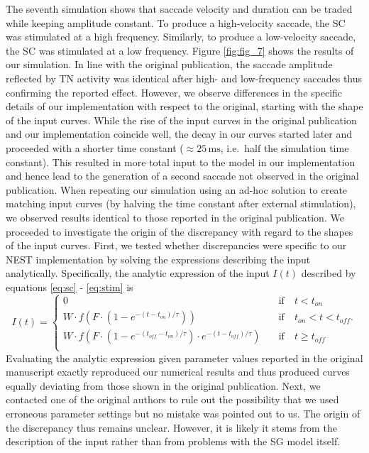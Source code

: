 \documentclass[10pt,a4paper,onecolumn]{article}
\begin{document}
The seventh simulation shows that saccade velocity and duration can be
traded while keeping amplitude constant. To produce a high-velocity
saccade, the SC was stimulated at a high frequency. Similarly, to
produce a low-velocity saccade, the SC was stimulated at a low
frequency. Figure \ref{fig:fig_7} shows the results of our simulation.
In line with the original publication, the saccade amplitude reflected
by TN activity was identical after high- and low-frequency saccades thus
confirming the reported effect. However, we observe differences in the
specific details of our implementation with respect to the original,
starting with the shape of the input curves. While the rise of the input
curves in the original publication and our implementation coincide well,
the decay in our curves started later and proceeded with a shorter time
constant (\(\approx25\,\mathrm{ms}\), i.e.~half the simulation time
constant). This resulted in more total input to the model in our
implementation and hence lead to the generation of a second saccade not
observed in the original publication. When repeating our simulation
using an ad-hoc solution to create matching input curves (by halving the
time constant after external stimulation), we observed results identical
to those reported in the original publication. We proceeded to
investigate the origin of the discrepancy with regard to the shapes of
the input curves. First, we tested whether discrepancies were specific
to our NEST implementation by solving the expressions describing the
input analytically. Specifically, the analytic expression of the input
\(I(t)\) described by equations \ref{eq:sc} - \ref{eq:stim} is
\begin{equation}
I(t)=
\left\{
\begin{array}{lll}
    0 \quad &\textrm{if} \quad t<{t}_{on} \\
    W \cdot f(F \cdot (1-{e}^{-(t-{t}_{on})/ \tau})) \quad &\textrm{if} \quad {t}_{on}<t<{t}_{off} \textrm{.}\\
    W \cdot f(F \cdot (1-{e}^{-({t}_{off}-{t}_{on})/ \tau}) \cdot {e}^{-(t-{t}_{off})/ \tau}) \quad &\textrm{if} \quad t \geq {t}_{off} \\
\end{array}
\right.
\label{eq:analytic}\end{equation} Evaluating the analytic expression
given parameter values reported in the original manuscript exactly
reproduced our numerical results and thus produced curves equally
deviating from those shown in the original publication. Next, we
contacted one of the original authors to rule out the possibility that
we used erroneous parameter settings but no mistake was pointed out to
us. The origin of the discrepancy thus remains unclear. However, it is
likely it stems from the description of the input rather than from
problems with the SG model itself.
\end{document}
